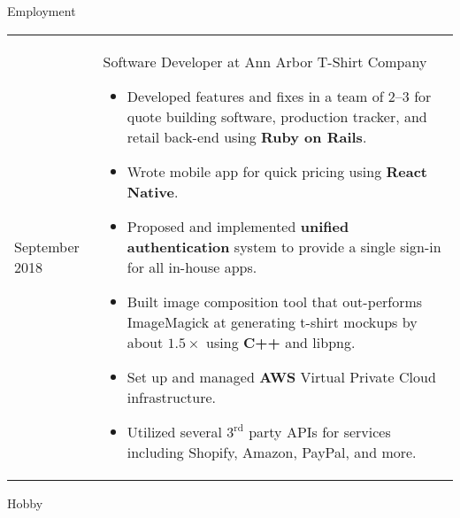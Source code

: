 \documentclass[11pt]{article}
\renewcommand{\section}[1]{{\Huge{#1}}\vspace{2 mm}}
\newenvironment{timeline}
        {\begin{tabular}{p{21 mm}|p{150 mm}}}
        {\end{tabular}}
\newenvironment{timelinetitle}
        {\vspace{-2 mm}\begin{large}}
        {\end{large}\vspace{-1.5 mm}}
\newcommand{\timespan}[2]{{#2}\newline{#1}}
\begin{document}
\vspace{3.0 mm}
\section{Employment}

\begin{timeline}
\timespan{February 2014}{September 2018}
&
\begin{timelinetitle}
    Software Developer at Ann Arbor T-Shirt Company
\end{timelinetitle}
\begin{itemize}
  \item Developed features and fixes in a team of 2--3 for quote building software,
        production tracker, and retail back-end using \textbf{Ruby on Rails}.

  \item Wrote mobile app for quick pricing using \textbf{React Native}.

  \item Proposed and implemented \textbf{unified authentication} system to provide a single sign-in for all in-house apps.

  \item Built image composition tool that out-performs ImageMagick
        at generating t-shirt mockups by about $1.5\times$ using \textbf{C++} and libpng.

  \item Set up and managed \textbf{AWS} Virtual Private Cloud infrastructure.
  
  \item Utilized several $3^\text{rd}$ party APIs for services including Shopify, Amazon, PayPal, and more.

\end{itemize}

\end{timeline}

\vspace{3.0 mm}
\section{Hobby}
\end{document}
